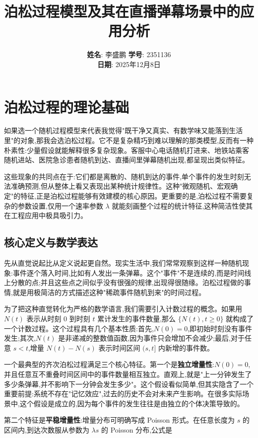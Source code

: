 \documentclass[12pt,a4paper]{article}
\title{\textbf{泊松过程模型及其在直播弹幕场景中的应用分析}}
\author{
    \textbf{姓名}: 李盛鹏 \quad \textbf{学号}: 2351136 \\[10pt]
    \textbf{日期}: 2025年12月8日
}
\date{}
\begin{document}
\maketitle

\section{泊松过程的理论基础}

如果选一个随机过程模型来代表我觉得"既干净又真实、有数学味又能落到生活里"的对象,那我会选泊松过程。它不是复杂精巧到难以理解的那类模型,反而有一种朴素性:少量假设就能解释很多复杂现象。客服中心电话随机打进来、地铁站乘客随机进站、医院急诊患者随机到达、直播间里弹幕随机出现,都呈现出类似特征。

这些现象的共同点在于:它们都是离散的、随机到达的事件,单个事件的发生时刻无法准确预测,但从整体上看又表现出某种统计规律性。这种"微观随机、宏观确定"的特征,正是泊松过程能够有效建模的核心原因。更重要的是,泊松过程不需要复杂的参数设置,仅用一个速率参数 $\lambda$ 就能刻画整个过程的统计特征,这种简洁性使其在工程应用中极具吸引力。

\subsection{核心定义与数学表达}

先从直觉说起比从定义说起更自然。现实生活中,我们常常观察到这样一种随机现象:事件逐个落入时间,比如有人发出一条弹幕。这个"事件"不是连续的,而是时间线上分散的点;并且这些点之间似乎没有很强的规律,出现得很随缘。泊松过程做的事情,就是用极简洁的方式描述这种"稀疏事件随机到来"的时间过程。

为了把这种直觉转化为严格的数学语言,我们需要引入计数过程的概念。如果用 $N(t)$ 表示从时刻 0 到时刻 $t$ 累计发生的事件数量,那么 $\{N(t), t \geq 0\}$ 就构成了一个计数过程。这个过程具有几个基本性质:首先,$N(0) = 0$,即初始时刻没有事件发生;其次,$N(t)$ 是非递减的整数值函数,因为事件只会增加不会减少;最后,对于任意 $s < t$,增量 $N(t) - N(s)$ 表示时间区间 $(s,t]$ 内新增的事件数。

一个最典型的齐次泊松过程满足三个核心特征。第一个是\textbf{独立增量性}:$N(0)=0$,并且任意互不重叠时间区间中的事件数量相互独立。直观上,就是"上一分钟发生了多少条弹幕,并不影响下一分钟会发生多少"。这个假设看似简单,但其实隐含了一个重要前提:系统不存在"记忆效应",过去的历史不会对未来产生影响。在很多实际场景中,这个假设是成立的,因为每个事件的发生往往是由独立的个体决策导致的。

第二个特征是\textbf{平稳增量性}:增量分布可明确写成 Poisson 形式。在任意长度为 $s$ 的区间内,到达次数服从参数为 $\lambda s$ 的 Poisson 分布,公式是
\end{document}
